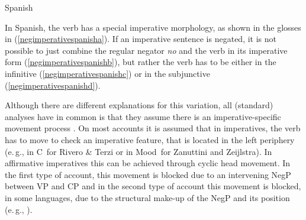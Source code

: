\begin{exe}
\ex Spanish \citep[57--58]{van2007imperatives}\label{negimperativespanish}
\begin{xlist}
\end{xlist}
\end{exe}

\noindent In Spanish, the verb has a special imperative morphology, as shown in the glosses in (\ref{negimperativespanisha}). If an imperative sentence is negated, it is not possible to just combine the regular negator \textit{no} and the verb in its imperative form (\ref{negimperativespanishb}), but rather the verb has to be either in the infinitive (\ref{negimperativespanishc}) or in the subjunctive (\ref{negimperativespanishd}). 

Although there are different explanations for this variation, all (standard) analyses have in common is that they assume there is an imperative-specific movement process \citep{zanuttini1991syntactic, rivero1994negation, rivero1995imperatives, platzack1998subject, zeijlstra2004sentential}. On most accounts it is assumed that in imperatives, the verb has to move to check an imperative feature, that is located in the left periphery (e.\,g., in C\textdegree\ for Rivero \& Terzi or in Mood\textdegree\ for Zanuttini and Zeijlstra). In affirmative imperatives this can be achieved through cyclic head movement. In the first type of account, this movement is blocked due to an intervening NegP between VP and CP \citep{rivero1994negation, rivero1995imperatives} and in the second type of account this movement is blocked, in some languages, due to the structural make-up of the NegP and its position (e.\,g., \citealt{zeijlstra2004sentential}).

